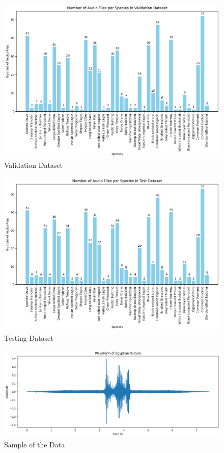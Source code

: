 \begin{figure}[h!]
    \centering
    \includegraphics[scale=0.4]{images/ValidationDataset.png}
    \caption{Validation Dataset}
\end{figure}
\newpage
\begin{figure}[h!]
    \centering
    \includegraphics[scale=0.45]{images/TestDataset.png}
    \caption{Testing Dataset}
\end{figure}
\hspace{3.5cm}
\begin{figure}[h!]
    \centering
    \label{SampleData}
    \includegraphics[scale=0.38]{images/SampleData.png}
    \caption{Sample of the Data}
\end{figure}
\newpage
